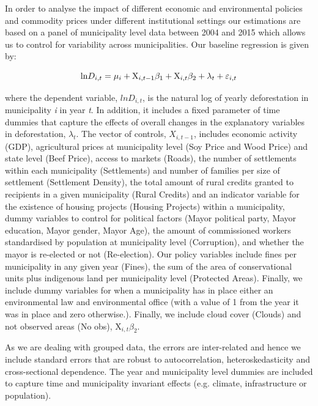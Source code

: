In order to analyse the impact of different economic and environmental policies and commodity prices under different institutional settings our estimations are based on a panel of municipality level data between 2004 and 2015 which allows us to control for variability across municipalities.  Our baseline regression is given by:

\begin{equation}
    \text{ln}D_{i,t} = \mu_{i} + \text{X}_{i,t-1}\beta_{1}  + \text{X}_{i,t} \beta_{2} + \lambda_{t} + \varepsilon_{i,t} \label{eq:1} \\\\
\end{equation}


where the dependent variable, $lnD_{i,t}$, is the natural log of yearly deforestation in municipality \textit{i} in year \textit{t}. In addition, it includes a fixed parameter of time dummies that capture the effects of overall changes in the explanatory variables in deforestation, $\lambda_{t}$. The vector of controls, $X_{i,t-1}$, includes economic activity (GDP), agricultural prices at municipality level (Soy Price and Wood Price) and state level (Beef Price), access to markets (Roads), the number of settlements within each municipality (Settlements) and number of families per size of settlement (Settlement Density), the total amount of rural credits granted to recipients in a given municipality (Rural Credits) and an indicator variable for the existence of housing projects (Housing Projects) within a municipality, dummy variables to control for political factors (Mayor political party, Mayor education, Mayor gender, Mayor Age), the amount of commissioned workers standardised by population at municipality level (Corruption), and whether the mayor is re-elected or not (Re-election). Our policy variables include fines per municipality in any given year (Fines), the sum of the area of conservational units plus indigenous land per municipality level (Protected Areas). Finally, we include dummy variables for when a municipality has in place either an environmental law and environmental office (with a value of 1 from the year it was in place and zero otherwise.). Finally, we include cloud cover (Clouds) and not observed areas (No obs), $\text{X}_{i,t} \beta_{2}$.

As we are dealing with grouped data, the errors are inter-related and hence we include \citet{DRISCOLL} standard errors that are robust to autocorrelation, heteroskedasticity and cross-sectional dependence. The year and municipality level dummies are included to capture time and municipality invariant effects (e.g. climate, infrastructure or population).

